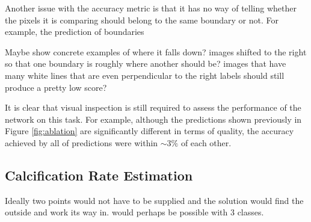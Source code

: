 Another issue with the accuracy metric is that it has no way of telling whether the pixels it is comparing should belong to the same boundary or not. For example, the prediction of boundaries

Maybe show concrete examples of where it falls down? images shifted to the right so that one boundary is roughly where another should be? images that have many white lines that are even perpendicular to the right labels should still produce a pretty low score?

It is clear that visual inspection is still required to assess the performance of the network on this task. For example, although the predictions shown previously in Figure \ref{fig:ablation} are significantly different in terms of quality, the accuracy achieved by all of predictions were within ${\sim}3\%$ of each other.

\subsection{Calcification Rate Estimation}

Ideally two points would not have to be supplied and the solution would find the outside and work its way in. would perhaps be possible with 3 classes.




